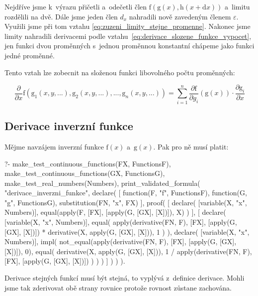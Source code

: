 Nejdříve jsme k~výrazu přičetli a~odečetli člen \(\mathrm{f}(\mathrm{g}(x), \mathrm{h}(x + \mathrm{d}x))\) a~limitu rozdělili na dvě. Dále jsme jeden člen \(d_x\) nahradili nově zavedeným členem \(\varepsilon\). Využili jsme při tom vztahu \eqref{eq:zuzeni_limity_stejne_promenne}.
Nakonec jsme limity nahradili derivacemi podle vztahu~\eqref{eq:derivace_slozene_funkce_vypocet}, jen funkci dvou proměnných s~jednou proměnnou konstantní chápeme jako funkci jedné proměnné.

Tento vztah lze zobecnit na složenou funkci libovolného počtu proměnných:

\begin{equation}
\frac{\partial}{\partial x} \mathrm{f} (\mathrm{g}_1(x, y, ...), \mathrm{g}_2(x, y, ...), ..., \mathrm{g}_n(x, y, ...)) = \sum_{i=1}^n \frac{\partial \mathrm{f}}{\partial g_i}(\mathrm{g}(x)) \cdot \frac{\partial \mathrm{g}_i}{\partial x}
\end{equation}

\subsection{Derivace inverzní funkce}

Mějme navzájem inverzní funkce \(\mathrm{f}(x)\) a~\(\mathrm{g}(x)\). Pak pro ně musí platit:

\begin{prolog}
?-	make_test_continuous_functions(FX, FunctionsF),
	make_test_continuous_functions(GX, FunctionsG),
	make_test_real_numbers(Numbers),
	print_validated_formula(
		"derivace_inverzni_funkce",
		declare(
			[
				function(F, "f", FunctionsF),
				function(G, "g", FunctionsG),
				substitution(FN, "x", FX)
			],
			proof(
				[
					declare(
						[variable(X, "x", Numbers)],
						equal(apply(F, [FX], [apply(G, [GX], [X])]), X)
					)
				],
				[
					declare(
						[variable(X, "x", Numbers)],
						equal(
							apply(derivative(FN, F), [FX], [apply(G, [GX], [X])]) * derivative(X, apply(G, [GX], [X])),
							1
						)
					),
					declare(
						[variable(X, "x", Numbers)],
						impl(
							not_equal(apply(derivative(FN, F), [FX], [apply(G, [GX], [X])]), 0),
							equal(
								derivative(X, apply(G, [GX], [X])),
								1 / apply(derivative(FN, F), [FX], [apply(G, [GX], [X])])
							)
						)
					)
				]
			)
		)
	).
\end{prolog}

Derivace stejných funkcí musí být stejná, to vyplývá z~definice derivace. Mohli jsme tak zderivovat obě strany rovnice protože rovnost zůstane zachována.

